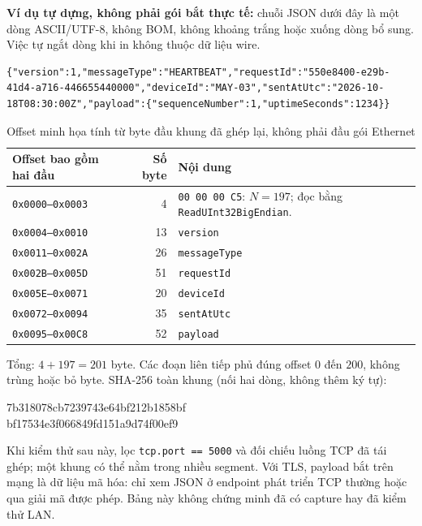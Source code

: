 \documentclass[12pt,a4paper]{article}
\begin{document}
\textbf{Ví dụ tự dựng, không phải gói bắt thực tế:} chuỗi JSON dưới đây là một dòng ASCII/UTF-8, không BOM, không khoảng trắng hoặc xuống dòng bổ sung. Việc tự ngắt dòng khi in không thuộc dữ liệu wire.
\begin{lstlisting}[basicstyle=\ttfamily\small,breaklines=true,breakatwhitespace=false,columns=fullflexible,caption={HEARTBEAT tự dựng dùng để tính byte}]
{"version":1,"messageType":"HEARTBEAT","requestId":"550e8400-e29b-41d4-a716-446655440000","deviceId":"MAY-03","sentAtUtc":"2026-10-18T08:30:00Z","payload":{"sequenceNumber":1,"uptimeSeconds":1234}}
\end{lstlisting}
\begin{table}[H]
\centering\small
\caption{Offset minh họa tính từ byte đầu khung đã ghép lại, không phải đầu gói Ethernet}
\label{tab:wireshark-byte-inspection}
\begin{tabularx}{\textwidth}{|l|r|X|}\hline
\textbf{Offset bao gồm hai đầu} & \textbf{Số byte} & \textbf{Nội dung} \\ \hline
\texttt{0x0000--0x0003} & 4 & \texttt{00 00 00 C5}: $N=197$; đọc bằng \texttt{ReadUInt32BigEndian}. \\ \hline
\texttt{0x0004--0x0010} & 13 & \texttt{version} \\ \hline
\texttt{0x0011--0x002A} & 26 & \texttt{messageType} \\ \hline
\texttt{0x002B--0x005D} & 51 & \texttt{requestId} \\ \hline
\texttt{0x005E--0x0071} & 20 & \texttt{deviceId} \\ \hline
\texttt{0x0072--0x0094} & 35 & \texttt{sentAtUtc} \\ \hline
\texttt{0x0095--0x00C8} & 52 & \texttt{payload} \\ \hline
\end{tabularx}
\end{table}
Tổng: $4+197=201$ byte. Các đoạn liên tiếp phủ đúng offset $0$ đến $200$, không trùng hoặc bỏ byte. SHA-256 toàn khung (nối hai dòng, không thêm ký tự):
\begin{center}\ttfamily\small 7b318078cb7239743e64bf212b1858bf\\bf17534e3f066849fd151a9d74f00ef9\end{center}

Khi kiểm thử sau này, lọc \texttt{tcp.port == 5000} và đối chiếu luồng TCP đã tái ghép; một khung có thể nằm trong nhiều segment. Với TLS, payload bắt trên mạng là dữ liệu mã hóa: chỉ xem JSON ở endpoint phát triển TCP thường hoặc qua giải mã được phép. Bảng này không chứng minh đã có capture hay đã kiểm thử LAN.
\end{document}
